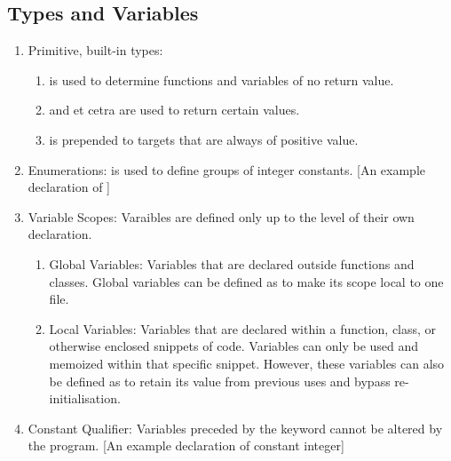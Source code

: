 \subsection{Types and Variables}
\begin{enumerate}
\item Primitive, built-in types:
    \begin{enumerate}
    \item {} is used to determine functions and variables of no return
        value.
    \item {} and et cetra are used to return
        certain values.
    \item {} is prepended to targets that are always of positive
        value.
    \end{enumerate}
\item Enumerations:  is used to define groups of integer constants.
    \begingroup
    [An example declaration of ]
    \endgroup
\item Variable Scopes: Varaibles are defined only up to the level of their own
    declaration.
    \begin{enumerate}
    \item Global Variables: Variables that are declared outside functions and
        classes. Global variables can be defined as  to make its
        scope local to one file.
    \item Local Variables: Variables that are declared within a function, class,
        or otherwise enclosed snippets of code. Variables can only be used and
        memoized within that specific snippet. However, these variables can also
        be defined as  to retain its value from previous uses and
        bypass re-initialisation.
    \end{enumerate}
\item Constant Qualifier: Variables preceded by the keyword  cannot
    be altered by the program. \begingroup
    [An example declaration of constant integer]
    \endgroup
\end{enumerate}

